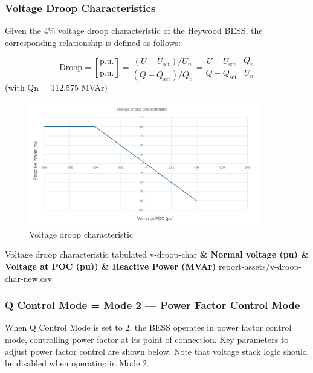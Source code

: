 \documentclass{../grid-link-report}
\begin{document}
		\subsubsection{Voltage Droop Characteristics}
		
		
		Given the 4\% voltage droop characteristic of the Heywood BESS, the corresponding relationship is defined as follows:
		
		
		\[
		\text{Droop} =  \left[ \frac{\text{p.u.}}{\text{p.u.}} \right] = \frac{(U - U_{\text{set}})/U_n}{(Q - Q_{\text{set}})/Q_n} = \frac{U - U_{\text{set}}}{Q - Q_{\text{set}}} \cdot \frac{Q_n}{U_n}
		\]
		(with Qn = 112.575 MVAr)
		
		
		
		\begin{figure}[H]
			\centering
			\includegraphics[width=0.9\textwidth]{report-assets/images/vdroop-char.png}
			\caption{Voltage droop characteristic}
			\label{fig:vdroop-char}
		\end{figure}
		
		{Voltage droop characteristic tabulated}
		{v-droop-char}
		{\bfseries \color{white} & \bfseries \color{white}Normal voltage (pu) & \bfseries \color{white}Voltage at POC (pu)) & \bfseries \color{white}Reactive Power (MVAr)}
		{report-assets/v-droop-char-new.csv}
		
		
		\subsubsection{Q Control Mode = Mode 2 — Power Factor Control Mode}
		
		When Q Control Mode is set to 2, the BESS operates in power factor control mode, controlling power factor at its point of connection. Key parameters to adjust power factor control are shown below. Note that voltage stack logic should be disabled when operating in Mode 2.
		
\end{document}
